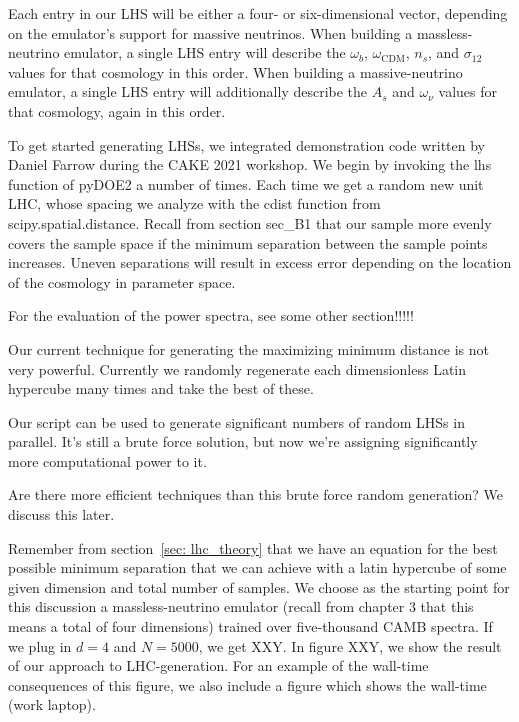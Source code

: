 Each entry in our LHS will be either a four- or six-dimensional vector, 
depending on the emulator's support for massive neutrinos. When building a
massless-neutrino emulator, a single LHS entry will describe the $\omega_b$,
$\omega_\text{CDM}$, $n_s$, and $\sigma_{12}$ values for that cosmology in 
this order. When building a massive-neutrino emulator, a single LHS entry will 
additionally describe the $A_s$ and $\omega_\nu$ values for that cosmology, 
again in this order.

To get started generating LHSs, we integrated demonstration code written by Daniel Farrow  during the CAKE 2021 workshop. We begin by invoking the lhs function of pyDOE2 a number of times. Each time we get a random new unit LHC, whose spacing we analyze with the cdist function from scipy.spatial.distance.  Recall from section sec\_B1 that our sample more evenly covers the sample space if the minimum separation between the sample points increases. Uneven separations will result in excess error depending on the location of the cosmology in parameter space.


For the evaluation of the power spectra, see some other section!!!!!



Our current technique for generating the  maximizing minimum distance is not very powerful.
Currently we randomly regenerate each dimensionless Latin hypercube many
times and take the best of these.

Our script can be used to generate significant numbers of random LHSs in
parallel. It’s still a brute force solution, but now we’re assigning
significantly more computational power to it.

Are there more efficient techniques than this brute force random generation?
We discuss this later. 

Remember from section~\ref{sec: lhc_theory} that we have an equation for the
best possible minimum separation that we can achieve with a latin hypercube
of some given dimension and total number of samples. We choose as the starting
point for this discussion a massless-neutrino emulator (recall from chapter 3
that this means a total of four dimensions) trained over five-thousand CAMB
spectra. If we plug in $d = 4$ and $N=5000$, we get XXY. In figure XXY, we
show the result of our approach to LHC-generation. For an example of the
wall-time consequences of this figure, we also include a figure which shows
the wall-time (work laptop).

